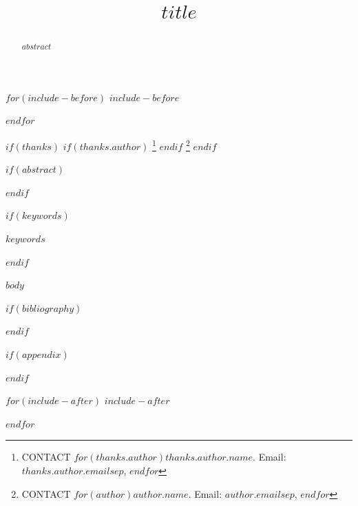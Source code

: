 \documentclass[$for(classoption)$$classoption$$sep$,$endfor$]{interact}
\theoremstyle{plain}%
\theoremstyle{definition}
\theoremstyle{remark}
\begin{document}
$for(include-before)$
$include-before$

$endfor$


\title{$title$}


\author{
}

$if(thanks)$
$if(thanks.author)$
\thanks{CONTACT $for(thanks.author)$$thanks.author.name$. Email: $thanks.author.email$$sep$, $endfor$}
$endif$
\thanks{CONTACT $for(author)$$author.name$. Email: $author.email$$sep$, $endfor$}
$endif$

\maketitle

$if(abstract)$
\begin{abstract}
$abstract$
\end{abstract}
$endif$

$if(keywords)$
\begin{keywords}
$keywords$
\end{keywords}
$endif$

$body$

$if(bibliography)$


$endif$


$if(appendix)$

$endif$

$for(include-after)$
$include-after$

$endfor$
\end{document}
